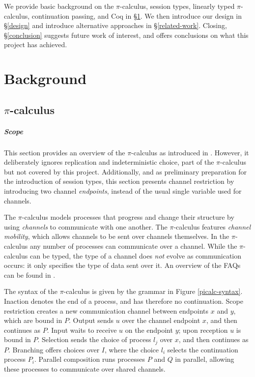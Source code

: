 \documentclass{mproj}
\newcommand{\picalc}{$\pi$-calculus}
\begin{document}
We provide basic background on the \picalc{}, session types, linearly typed \picalc{}, continuation passing, and Coq in \S \ref{background}. We then introduce our design in \S \ref{design} and introduce alternative approaches in \S \ref{related-work}. Closing, \S \ref{conclusion} suggests future work of interest, and offers conclusions on what this project has achieved.

\chapter{Background}\label{background}

\section{\picalc}\label{pi-calculus}

\paragraph{Scope} This section provides an overview of the \picalc{} as introduced in \cite{Sangiorgi2001}. However, it deliberately ignores replication and indeterministic choice, part of the \picalc{} but not covered by this project. Additionally, and as preliminary preparation for the introduction of session types, this section presents channel restriction by introducing two channel \emph{endpoints}, instead of the usual single variable used for channels.

The \picalc{} \cite{Walker1989,Milner1989,Milner1991,Sangiorgi2001} models processes that progress and change their structure by using \emph{channels} to communicate with one another. The \picalc{} features \emph{channel mobility}, which allows channels to be sent over channels themselves. In the \picalc{} any number of processes can communicate over a channel. While the \picalc{} can be typed, the type of a channel does \emph{not} evolve as communication occurs: it only specifies the type of data sent over it. An overview of the FAQs can be found in \cite{Wing2002}.

The syntax of the \picalc{} is given by the grammar in Figure \ref{picalc-syntax}. Inaction denotes the end of a process, and has therefore no continuation. Scope restriction creates a new communication channel between endpoints $x$ and $y$, which are bound in $P$. Output sends $u$ over the channel endpoint $x$, and then continues as $P$. Input waits to receive $u$ on the endpoint $y$; upon reception $u$ is bound in $P$. Selection sends the choice of process $l_j$ over $x$, and then continues as $P$. Branching offers choices over $I$, where the choice $l_i$ selects the continuation process $P_i$. Parallel composition runs processes $P$ and $Q$ in parallel, allowing these processes to communicate over shared channels.
\end{document}
